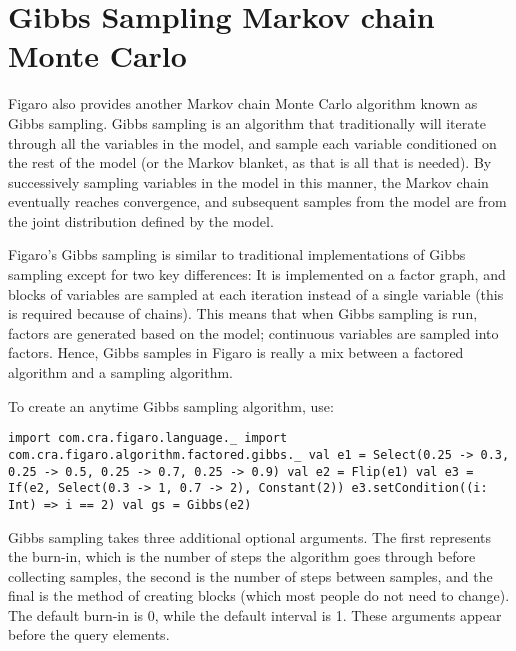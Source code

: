 \section{Gibbs Sampling Markov chain Monte Carlo}

Figaro also provides another Markov chain Monte Carlo algorithm known as Gibbs sampling. Gibbs sampling is an algorithm that traditionally will iterate through all the variables in the model, and sample each variable conditioned on the rest of the model (or the Markov blanket, as that is all that is needed). By successively sampling variables in the model in this manner, the Markov chain eventually reaches convergence, and subsequent samples from the model are from the joint distribution defined by the model.

Figaro's Gibbs sampling is similar to traditional implementations of Gibbs sampling except for two key differences: It is implemented on a factor graph, and blocks of variables are sampled at each iteration instead of a single variable (this is required because of chains). This means that when Gibbs sampling is run, factors are generated based on the model; continuous variables are sampled into factors. Hence, Gibbs samples in Figaro is really a mix between a factored algorithm and a sampling algorithm.

To create an anytime Gibbs sampling algorithm, use:

\begin{flushleft}
\texttt{import com.cra.figaro.language.\_
\newline import com.cra.figaro.algorithm.factored.gibbs.\_
\newline 
\newline val e1 = Select(0.25 -> 0.3, 0.25 -> 0.5, 0.25 -> 0.7, 0.25 -> 0.9)
\newline val e2 = Flip(e1)
\newline val e3 = If(e2, Select(0.3 -> 1, 0.7 -> 2), Constant(2))
\newline e3.setCondition((i: Int) => i == 2)
\newline 
\newline val gs = Gibbs(e2)
}
\end{flushleft}

Gibbs sampling takes three additional optional arguments. The first represents the burn-in, which is the number of steps the algorithm goes through before collecting samples, the second is the number of steps between samples, and the final is the method of creating blocks (which most people do not need to change). The default burn-in is 0, while the default interval is 1. These arguments appear before the query elements.

